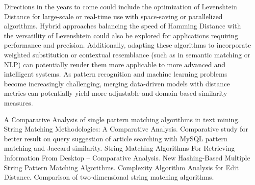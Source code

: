 \documentclass[conference]{IEEEtran}
\begin{document}
Directions in the years to come could include the optimization of Levenshtein Distance for large-scale or real-time use with space-saving or parallelized algorithms. Hybrid approaches balancing the speed of Hamming Distance with the versatility of Levenshtein could also be explored for applications requiring performance and precision. Additionally, adapting these algorithms to incorporate weighted substitution or contextual resemblance (such as in semantic matching or NLP) can potentially render them more applicable to more advanced and intelligent systems. As pattern recognition and machine learning problems become increasingly challenging, merging data-driven models with distance metrics can potentially yield more adjustable and domain-based similarity measures.


\begin{thebibliography}{00}
 A Comparative Analysis of single pattern matching algorithms in text mining.
 String Matching Methodologies: A Comparative Analysis.
 Comparative study for better result on query suggestion of article searching with MySQL pattern matching and Jaccard similarity.
 String Matching Algorithms For Retrieving Information From Desktop – Comparative Analysis.
 New Hashing-Based Multiple String Pattern Matching Algorithms.
 Complexity Algorithm Analysis for Edit Distance.
 Comparison of two-dimensional string matching algorithms.
\end{thebibliography}
\end{document}
